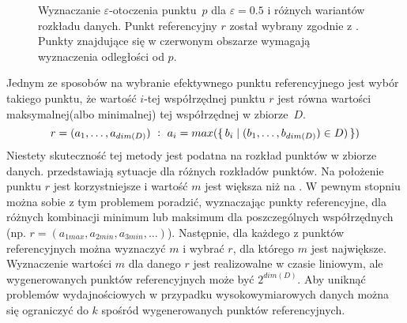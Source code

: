 \begin{figure}
\begin{minipage}[b]{.5\linewidth}
		\subcaption{}\label{img:ti-max-ref-bad}
	\end{minipage}
	\caption{Wyznaczanie $ \varepsilon $-otoczenia \mbox{punktu $ p $} dla $ \varepsilon =0.5 $ i różnych wariantów rozkładu danych. Punkt referencyjny $ r $ został wybrany zgodnie z . Punkty znajdujące się w czerwonym obszarze wymagają wyznaczenia odległości od $ p $.}\label{img:ti-max-ref}
\end{figure}

Jednym ze sposobów na wybranie efektywnego punktu referencyjnego jest wybór takiego punktu, że wartość $i $-tej współrzędnej punktu $ r $ jest równa wartości maksymalnej(albo minimalnej) tej współrzędnej w \mbox{zbiorze $ D $.}
\begin{equation}\label{eq:ti-max-ref}
	r=(a_1,\dots,a_{dim(D)})\ :\ a_i = max(\set{b_i | (b_1,\dots,b_{dim(D)}) \in D)})
\end{equation}
Niestety skuteczność tej metody jest podatna na rozkład punktów w zbiorze danych.  przedstawiają sytuacje dla różnych rozkładów punktów. Na  położenie punktu $ r $ jest korzystniejsze i wartość $ m $ jest większa niż na . W pewnym stopniu można sobie z tym problemem poradzić, wyznaczając punkty referencyjne, dla różnych kombinacji minimum lub maksimum dla poszczególnych współrzędnych (np. $ r=(a_{1max}, a_{2min}, a_{3min}, \dots) $). Następnie, dla każdego z punktów referencyjnych można wyznaczyć $ m $ i wybrać $ r $, dla którego $ m $ jest największe. Wyznaczenie wartości $ m $ dla danego $ r $ jest realizowalne w czasie liniowym, ale wygenerowanych punktów referencyjnych może być $ 2^{dim(D)} $. Aby uniknąć problemów wydajnościowych w przypadku wysokowymiarowych danych można się ograniczyć do $ k $ spośród wygenerowanych punktów referencyjnych. 

